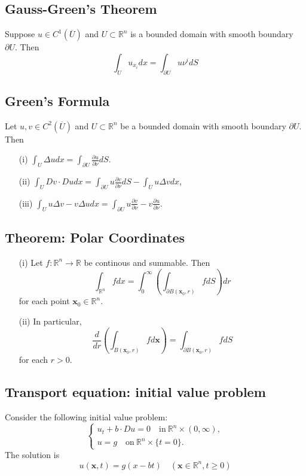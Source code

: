 \documentclass[10pt]{article}
\def\rr{{\mathbb R}}
\def\vc{{\mathbf x}}
\begin{document}
\subsection{Gauss-Green's Theorem}
Suppose $ u\in C^1(\overline{U})$ and $U \subset \rr^n$ is a bounded domain with smooth boundary $\partial U$. Then
\begin{equation*}
    \int_U  u_{x_i} dx = \int_{\partial U} u \nu^i dS
\end{equation*}

\subsection{Green's Formula}
    Let $u, v \in C^2(\overline{U})$ and $U \subset \rr^n$ be a bounded domain with smooth boundary $\partial U$. Then
    \begin{itemize}
        \item [(i)] $\int_U \Delta u dx = \int_{\partial U} \frac{\partial u}{\partial \nu} dS$.
        \item [(ii)] $\int_U Dv \cdot Du dx = \int_{\partial U} u \frac{\partial v}{\partial \nu} dS - \int_U u \Delta v dx$,
        \item [(iii)] $\int_U u \Delta v - v \Delta u dx = \int_{\partial U} u \frac{\partial v}{\partial \nu} - v \frac{\partial u}{\partial \nu}$.
    \end{itemize}
\subsection{Theorem: Polar Coordinates}
\begin{itemize}
    \item [(i)] Let $f:\rr^n\to \rr$ be continous and summable. Then
    \begin{equation*}
        \int_{\rr^n} f dx = \int_0^\infty \left(\int_{\partial B(\vc_0,r)} f dS\right) dr
    \end{equation*}
    for each point $\vc_0 \in \rr^n$.
    \item [(ii)] In particular, 
    \begin{equation*}
        \frac{d}{dr}\left(\int_{B(\vc_0,r)}f d\vc\right) = \int_{\partial B(\vc_0,r)} f dS
    \end{equation*}
    for each $r>0$.
\end{itemize}
\subsection{Transport equation: initial value problem}
Consider the following initial value problem:
\begin{equation*}
    \begin{cases}
        u_t + b\cdot D u = 0\quad \text{in} \ \rr^n\times (0,\infty),\\
        u = g \quad\text{on} \ \rr^n \times \{t=0\}.
    \end{cases}
\end{equation*}
The solution is 
\begin{equation}
    \label{Tis}
    u(\mathbf{x},t) = g(x-bt) \quad (\mathbf{x} \in \rr^n, t\geq 0)
\end{equation}
\end{document}
